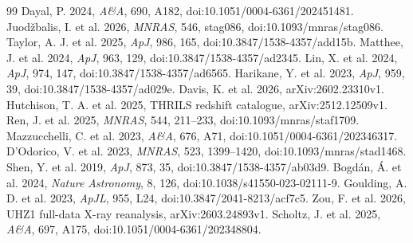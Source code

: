 \documentclass[11pt]{article}
\begin{document}
\begin{thebibliography}{99}
 Dayal, P. 2024, \emph{A\&A}, 690, A182, doi:10.1051/0004-6361/202451481.
 Juod\v{z}balis, I. et al. 2026, \emph{MNRAS}, 546, stag086, doi:10.1093/mnras/stag086.
 Taylor, A. J. et al. 2025, \emph{ApJ}, 986, 165, doi:10.3847/1538-4357/add15b.
 Matthee, J. et al. 2024, \emph{ApJ}, 963, 129, doi:10.3847/1538-4357/ad2345.
 Lin, X. et al. 2024, \emph{ApJ}, 974, 147, doi:10.3847/1538-4357/ad6565.
 Harikane, Y. et al. 2023, \emph{ApJ}, 959, 39, doi:10.3847/1538-4357/ad029e.
 Davis, K. et al. 2026, arXiv:2602.23310v1.
 Hutchison, T. A. et al. 2025, THRILS redshift catalogue, arXiv:2512.12509v1.
 Ren, J. et al. 2025, \emph{MNRAS}, 544, 211--233, doi:10.1093/mnras/staf1709.
 Mazzucchelli, C. et al. 2023, \emph{A\&A}, 676, A71, doi:10.1051/0004-6361/202346317.
 D'Odorico, V. et al. 2023, \emph{MNRAS}, 523, 1399--1420, doi:10.1093/mnras/stad1468.
 Shen, Y. et al. 2019, \emph{ApJ}, 873, 35, doi:10.3847/1538-4357/ab03d9.
 Bogd\'an, \'A. et al. 2024, \emph{Nature Astronomy}, 8, 126, doi:10.1038/s41550-023-02111-9.
 Goulding, A. D. et al. 2023, \emph{ApJL}, 955, L24, doi:10.3847/2041-8213/acf7c5.
 Zou, F. et al. 2026, UHZ1 full-data X-ray reanalysis, arXiv:2603.24893v1.
 Scholtz, J. et al. 2025, \emph{A\&A}, 697, A175, doi:10.1051/0004-6361/202348804.
\end{thebibliography}
\end{document}
